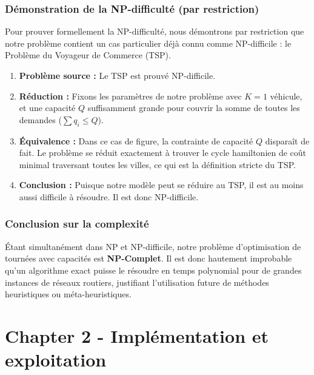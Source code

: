\subsubsection*{Démonstration de la NP-difficulté (par restriction)}
{}

Pour prouver formellement la NP-difficulté, nous démontrons par restriction que notre problème contient un cas particulier déjà connu comme NP-difficile : le Problème du Voyageur de Commerce (TSP).
\begin{enumerate}
    \item \textbf{Problème source :} Le TSP est prouvé NP-difficile.
    \item \textbf{Réduction :} Fixons les paramètres de notre problème avec $K = 1$ véhicule, et une capacité $Q$ suffisamment grande pour couvrir la somme de toutes les demandes ($\sum q_i \leq Q$).
    \item \textbf{Équivalence :} Dans ce cas de figure, la contrainte de capacité $Q$ disparaît de fait. Le problème se réduit exactement à trouver le cycle hamiltonien de coût minimal traversant toutes les villes, ce qui est la définition stricte du TSP.
    \item \textbf{Conclusion :} Puisque notre modèle peut se réduire au TSP, il est au moins aussi difficile à résoudre. Il est donc NP-difficile.
\end{enumerate}

\newpage

\subsubsection*{Conclusion sur la complexité}
{}

Étant simultanément dans NP et NP-difficile, notre problème d'optimisation de tournées avec capacités est \textbf{NP-Complet}. Il est donc hautement improbable qu'un algorithme exact puisse le résoudre en temps polynomial pour de grandes instances de réseaux routiers, justifiant l'utilisation future de méthodes heuristiques ou méta-heuristiques.

\newpage

\section*{Chapter 2 - Implémentation et exploitation}

